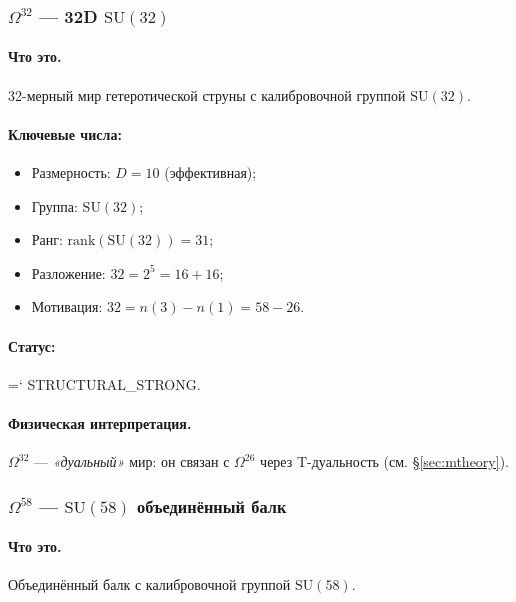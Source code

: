\documentclass[11pt,a4paper]{article}
\newcommand{\SU}{\mathrm{SU}}
\newcommand{\Omtw}{\Omega^{26}}
\newcommand{\Omth}{\Omega^{32}}
\newcommand{\Omfi}{\Omega^{58}}
\renewcommand{\texttt}[1]{{\ttfamily\hyphenchar\font=`\- #1}}
\theoremstyle{definition}
\begin{document}
\subsubsection{$\Omth$ --- 32D $\SU(32)$}

\paragraph{Что это.}
32-мерный мир гетеротической струны с калибровочной группой 
$\SU(32)$.

\paragraph{Ключевые числа:}
\begin{itemize}
    \item Размерность: $D = 10$ (эффективная);
    \item Группа: $\SU(32)$;
    \item Ранг: $\mathrm{rank}(\SU(32)) = 31$;
    \item Разложение: $32 = 2^5 = 16 + 16$;
    \item Мотивация: $32 = n(3) - n(1) = 58 - 26$.
\end{itemize}

\paragraph{Статус:} \texttt{STRUCTURAL\_STRONG}.

\paragraph{Физическая интерпретация.}
$\Omth$ — \emph{«дуальный»} мир: он связан с $\Omtw$ через 
T-дуальность (см. §\ref{sec:mtheory}).

\subsubsection{$\Omfi$ --- $\SU(58)$ объединённый балк}

\paragraph{Что это.}
Объединённый балк с калибровочной группой $\SU(58)$.
\end{document}

